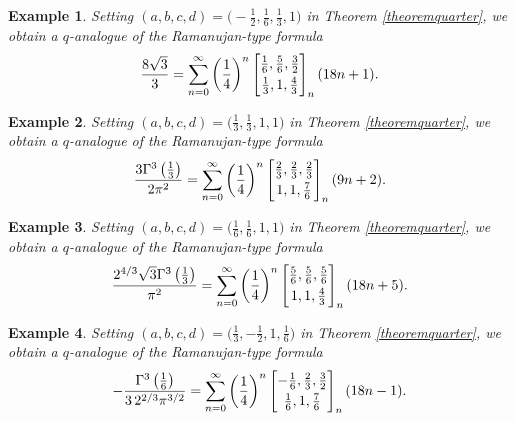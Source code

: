 \documentclass[12pt]{article}
\newtheorem{example}{Example}
\begin{document}
\begin{example}
 Setting $(a, b, c, d) = \big( -\frac{1}{2}, \frac{1}{6}, \frac{1}{3}, 1 \big)$ in Theorem \ref{theoremquarter}, we obtain a $q$-analogue 
 of the Ramanujan-type formula 
\begin{equation*}
 \frac{8\sqrt{3}}{3} = 
 \sum_{n = 0}^{\infty} 
 \left( \frac{1}{4} \right)^{n} \left[ \begin{matrix} 
 \frac{1}{6}, \frac{5}{6}, \frac{3}{2} 
 \vspace{1mm} \\ 
 \frac{1}{3}, 1, \frac{4}{3} 
 \end{matrix} \right]_{n} (18n + 1). 
 \end{equation*}
\end{example}

\begin{example}
 Setting $(a, b, c, d) = \big( \frac{1}{3}, \frac{1}{3}, 1, 1 \big)$ in Theorem \ref{theoremquarter}, we obtain a $q$-analogue of 
 the Ramanujan-type formula 
\begin{equation*}
 \frac{3 \Gamma^{3}\left( \frac{1}{3} \right) }{2 \pi^2} = 
 \sum_{n = 0}^{\infty} 
 \left( \frac{1}{4} \right)^{n} \left[ \begin{matrix} 
 \frac{2}{3}, \frac{2}{3}, \frac{2}{3} 
 \vspace{1mm} \\ 
 1, 1, \frac{7}{6} 
 \end{matrix} \right]_{n} (9 n + 2). 
 \end{equation*}
\end{example}

\begin{example}
 Setting $(a, b, c, d) = 
 \big( \frac{1}{6}, \frac{1}{6}, 1, 1 \big)$ in Theorem \ref{theoremquarter}, we obtain a $q$-analogue 
 of the Ramanujan-type formula 
\begin{equation*}
 \frac{2^{4/3} \sqrt{3} \Gamma^{3}\left( \frac{1}{3} \right)}{\pi^2} = 
 \sum_{n = 0}^{\infty} 
 \left( \frac{1}{4} \right)^{n} \left[ \begin{matrix} 
 \frac{5}{6}, \frac{5}{6}, \frac{5}{6} 
 \vspace{1mm} \\ 
 1, 1, \frac{4}{3} 
 \end{matrix} \right]_{n} (18n+5). 
 \end{equation*}
\end{example}

\begin{example}
 Setting $(a, b, c, d) = \big( \frac{1}{3}, -\frac{1}{2}, 1, \frac{1}{6} \big)$ in Theorem \ref{theoremquarter}, we obtain a $q$-analogue of 
 the Ramanujan-type formula 
\begin{equation*}
 -\frac{ \Gamma^{3}\left( \frac{1}{6} \right) }{3 \, 2^{2/3} \pi^{3/2} } = 
 \sum_{n = 0}^{\infty} 
 \left( \frac{1}{4} \right)^{n} \left[ \begin{matrix} 
 -\frac{1}{6}, \frac{2}{3}, \frac{3}{2} 
 \vspace{1mm} \\ 
 \frac{1}{6}, 1, \frac{7}{6} 
 \end{matrix} \right]_{n} (18 n - 1). 
 \end{equation*}
\end{example}
\end{document}
